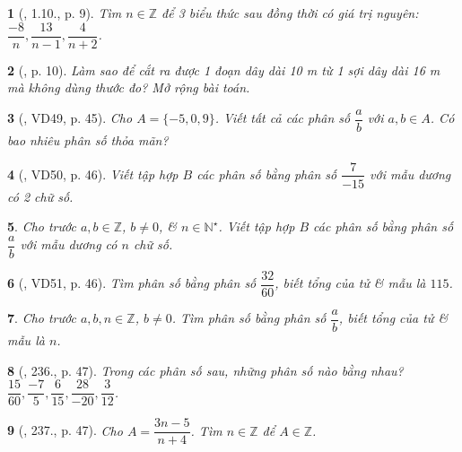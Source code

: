 \documentclass{article}
\newtheorem{baitoan}{}
\begin{document}
\begin{baitoan}[\cite{Binh_boi_duong_Toan_6_tap_2}, 1.10., p. 9]
	Tìm $n\in\mathbb{Z}$ để 3 biểu thức sau đồng thời có giá trị nguyên: $\dfrac{-8}{n},\dfrac{13}{n - 1},\dfrac{4}{n + 2}$.
\end{baitoan}

\begin{baitoan}[\cite{Binh_boi_duong_Toan_6_tap_2}, p. 10]
	Làm sao để cắt ra được 1 đoạn dây dài {\rm10 m} từ 1 sợi dây dài {\rm16 m} mà không dùng thước đo? Mở rộng bài toán.
\end{baitoan}

\begin{baitoan}[\cite{Tuyen_Toan_6}, VD49, p. 45]
	Cho $A = \{-5,0,9\}$. Viết tất cả các phân số $\dfrac{a}{b}$ với $a,b\in A$. Có bao nhiêu phân số thỏa mãn?
\end{baitoan}

\begin{baitoan}[\cite{Tuyen_Toan_6}, VD50, p. 46]
	Viết tập hợp $B$ các phân số bằng phân số $\dfrac{7}{-15}$ với mẫu dương có 2 chữ số.
\end{baitoan}

\begin{baitoan}
	Cho trước $a,b\in\mathbb{Z}$, $b\ne0$, \& $n\in\mathbb{N}^\star$. Viết tập hợp $B$ các phân số bằng phân số $\dfrac{a}{b}$ với mẫu dương có $n$ chữ số.
\end{baitoan}

\begin{baitoan}[\cite{Tuyen_Toan_6}, VD51, p. 46]
	Tìm phân số bằng phân số $\dfrac{32}{60}$, biết tổng của tử \& mẫu là $115$.
\end{baitoan}

\begin{baitoan}
	Cho trước $a,b,n\in\mathbb{Z}$, $b\ne0$. Tìm phân số bằng phân số $\dfrac{a}{b}$, biết tổng của tử \& mẫu là $n$.
\end{baitoan}

\begin{baitoan}[\cite{Tuyen_Toan_6}, 236., p. 47]
	Trong các phân số sau, những phân số nào bằng nhau? $\dfrac{15}{60},\dfrac{-7}{5},\dfrac{6}{15},\dfrac{28}{-20},\dfrac{3}{12}$.
\end{baitoan}

\begin{baitoan}[\cite{Tuyen_Toan_6}, 237., p. 47]
	Cho $A = \dfrac{3n - 5}{n + 4}$. Tìm $n\in\mathbb{Z}$ để $A\in\mathbb{Z}$.
\end{baitoan}
\end{document}
